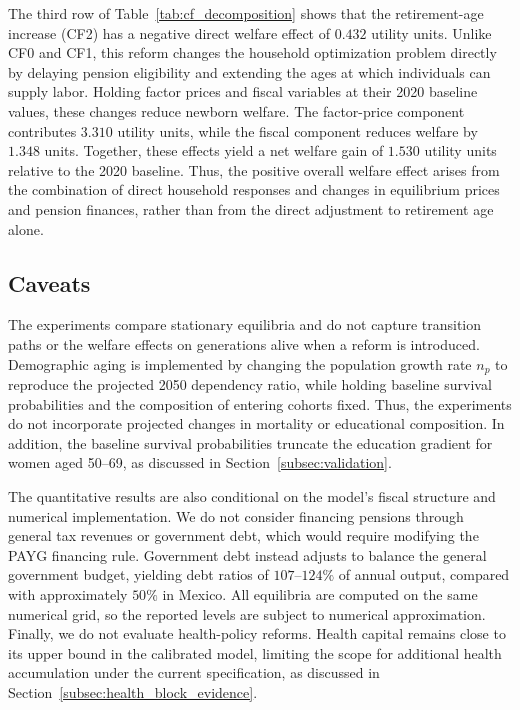 \documentclass[12pt,a4paper]{article}
\begin{document}
The third row of Table~\ref{tab:cf_decomposition} shows that the retirement-age increase (CF2) has a negative direct welfare effect of $0.432$ utility units. Unlike CF0 and CF1, this reform changes the household optimization problem directly by delaying pension eligibility and extending the ages at which individuals can supply labor. Holding factor prices and fiscal variables at their 2020 baseline values, these changes reduce newborn welfare. The factor-price component contributes $3.310$ utility units, while the fiscal component reduces welfare by $1.348$ units. Together, these effects yield a net welfare gain of $1.530$ utility units relative to the 2020 baseline. Thus, the positive overall welfare effect arises from the combination of direct household responses and changes in equilibrium prices and pension finances, rather than from the direct adjustment to retirement age alone.


\subsection{Caveats}
\label{subsec:exp_caveats}

The experiments compare stationary equilibria and do not capture transition paths or the welfare effects on generations alive when a reform is introduced. Demographic aging is implemented by changing the population growth rate $n_p$ to reproduce the projected 2050 dependency ratio, while holding baseline survival probabilities and the composition of entering cohorts fixed. Thus, the experiments do not incorporate projected changes in mortality or educational composition. In addition, the baseline survival probabilities truncate the education gradient for women aged 50--69, as discussed in Section~\ref{subsec:validation}.

The quantitative results are also conditional on the model's fiscal structure and numerical implementation. We do not consider financing pensions through general tax revenues or government debt, which would require modifying the PAYG financing rule. Government debt instead adjusts to balance the general government budget, yielding debt ratios of $107$--$124\%$ of annual output, compared with approximately $50\%$ in Mexico. All equilibria are computed on the same numerical grid, so the reported levels are subject to numerical approximation. Finally, we do not evaluate health-policy reforms. Health capital remains close to its upper bound in the calibrated model, limiting the scope for additional health accumulation under the current specification, as discussed in Section~\ref{subsec:health_block_evidence}.
\end{document}
